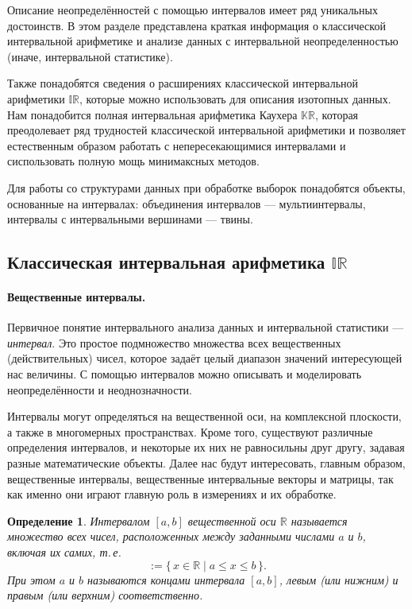 \documentclass[a5paper,openany]{book}
\newcommand{\mbb}{\mathbb}
\newtheorem{definition}{Определение}[section]
\begin{document}
Описание неопределённостей с помощью интервалов имеет ряд уникальных достоинств. %
В этом разделе представлена краткая информация о классической интервальной арифметике и анализе данных с интервальной неопределенностью (иначе, интервальной статистике).

Также понадобятся сведения о
расширениях классической интервальной арифметики $\mathbb{IR}$, которые можно использовать для  описания изотопных данных. Нам понадобится полная интервальная арифметика Каухера $\mathbb{KR}$, которая преодолевает ряд трудностей классической интервальной арифметики и позволяет естественным образом работать с непересекающимися интервалами и сиспользовать полную мощь минимаксных методов.

Для работы со структурами данных при обработке выборок понадобятся объекты, основанные на интервалах:
объединения интервалов --- мультиинтервалы, интервалы с интервальными вершинами --- твины.  

\subsection{Классическая интервальная арифметика $\mathbb{IR}$}
\label{PrimaryConceptChap} 

\paragraph{Вещественные интервалы.} 
Первичное понятие интервального анализа данных и интервальной статистики 
--- \emph{интервал}. Это простое подмножество множества всех вещественных 
(действительных) чисел, которое задаёт целый диапазон значений интересующей нас 
величины. С помощью интервалов можно описывать и моделировать неопределённости 
и неоднозначности. 

Интервалы могут определяться на вещественной оси, на комплексной плоскости, 
а также в многомерных пространствах. Кроме того, существуют различные определения 
интервалов, и некоторые их них не равносильны друг другу, задавая разные 
математические объекты. Далее нас будут интересовать, главным образом, вещественные 
интервалы, вещественные интервальные векторы и матрицы, так как именно они играют 
главную роль в измерениях и их обработке. 

\begin{definition} 
	\textsl{Интервалом} $[a,b]$ вещественной оси $\mbb{R}$ называется  
	множество всех чисел, расположенных между заданными числами $a$ и $b$, 
	включая их самих, т.\,е.                            
	\begin{equation*} 
	[a, b] := \{\, x\in\mbb{R} \mid a\leq x\leq b\,\}. 
	\end{equation*} 
	При этом $a$ и $b$ называются \textsl{концами} интервала $[a,b]$, \textsl{левым} 
	(или нижним) и \textsl{правым} (или верхним) соответственно. 
\end{definition}
\end{document}
